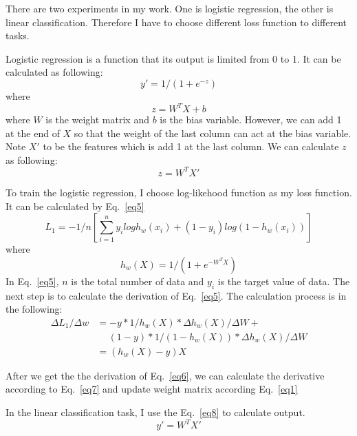 \documentclass[journal, a4paper]{IEEEtran}
\begin{document}
There are two experiments in my work. One is logistic regression, the other is linear classification. Therefore I have to choose different loss function to different tasks.

Logistic regression is a function that its output is limited from 0 to 1. It can be calculated as following:
\begin{equation}
y' = 1/(1+e^{-z}) \label{eq2}
\end{equation}
where
\begin{equation}
z = W^TX+b \label{eq3}
\end{equation}
where $W$ is the weight matrix and $b$ is the bias variable. However, we can add 1 at the end of $X$ so that the weight of the last column can act at the bias variable. Note $X'$ to be the features which is add 1 at the last column. We can calculate $z$ as following:
 \begin{equation}
z = W^TX' \label{eq4}
\end{equation}

To train the logistic regression, I choose log-likehood function as my loss function. It can be calculated by Eq.~\eqref{eq5}
\begin{equation}
L_1 = -1/n[\sum_{i=1}^ny_ilog h_w(x_i) + (1-y_i)log(1-h_w(x_i))] \label{eq5}
\end{equation}
where
\begin{equation}
h_w(X) = 1/(1+e^{-W^TX}) \label{eq6}
\end{equation}
In Eq.~\eqref{eq5}, $n$ is the total number of data and $y_i$ is the target value of data. The next step is to calculate the derivation of Eq.~\eqref{eq5}. The calculation process is in the following:
\begin{equation}
\begin{aligned}
\Delta L_1 / \Delta w & = -y*1/h_w(X)*{\Delta h_w(X)}/{\Delta W} + \\
& \quad \ (1-y)*1/(1-h_w(X))*{\Delta h_w(X)}/{\Delta W} \\
& =(h_w(X)-y)X
\label{eq7}
\end{aligned}
\end{equation}

After we get the the derivation of Eq.~\eqref{eq6}, we can calculate the derivative according to Eq.~\eqref{eq7} and update weight matrix according Eq.~\eqref{eq1}

In the linear classification task, I use the Eq.~\eqref{eq8} to calculate output.
\begin{equation}
y' = W^TX' \label{eq8}
\end{equation}
\end{document}
